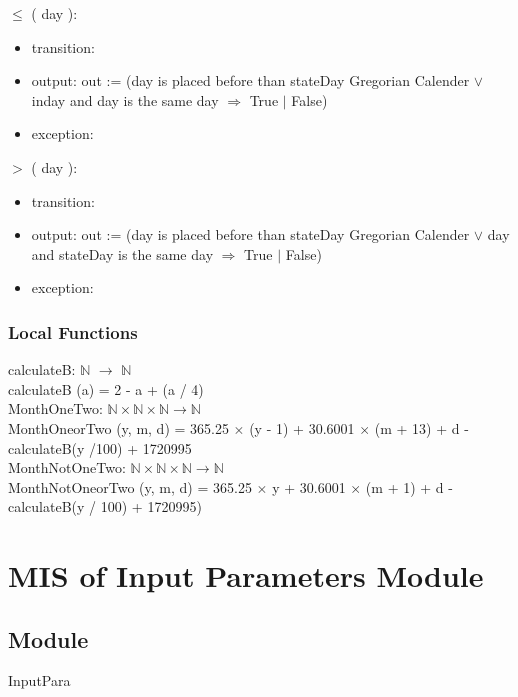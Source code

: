 \documentclass[12pt, titlepage]{article}
\begin{document}
\noindent  $\leq$ ( day ):
\begin{itemize}
\item transition: 
\item output: out := (day is placed before than stateDay Gregorian Calender $\lor	$ inday and day is the same day $\Rightarrow$ True $|$ False)
\item exception:
\end{itemize}

\noindent $>$  ( day ):
\begin{itemize}
\item transition: 
\item output: out := (day is placed before than stateDay Gregorian Calender $\lor	$ day and stateDay is the same day $\Rightarrow$ True $|$ False)
\item exception:
\end{itemize}

\subsubsection{Local Functions}

calculateB: $\mathbb{N}$ $\rightarrow $ $\mathbb{N}$\\
calculateB (a) = 2 - a + (a / 4)\\

MonthOneTwo: $\mathbb{N} \times \mathbb{N} \times \mathbb{N} \rightarrow \mathbb{N}$\\
MonthOneorTwo (y, m, d) = 365.25 $\times$ (y - 1) + 30.6001 $\times$ (m + 13) + d - calculateB(y /100) +  1720995\\


MonthNotOneTwo: $\mathbb{N} \times \mathbb{N} \times \mathbb{N} \rightarrow \mathbb{N}$\\
MonthNotOneorTwo (y, m, d) = 365.25 $\times$ y + 30.6001 $\times$ (m + 1) + d - calculateB(y / 100) +  1720995)



\newpage


\section{MIS of Input Parameters Module} \label{ModuleIP} 

\subsection{Module}
InputPara
\end{document}

